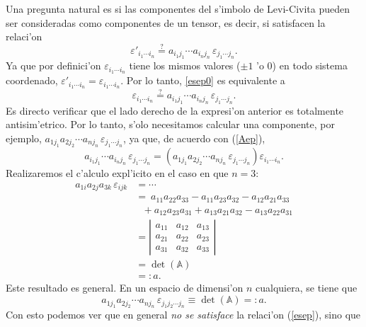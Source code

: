 Una pregunta natural es si las componentes del s'imbolo de Levi-Civita pueden ser consideradas como componentes de un tensor, es decir, si satisfacen la relaci'on
\begin{equation}\label{esep0}
\varepsilon'_{i_1\cdots i_n}\stackrel{?}{=}a_{i_1j_1}\cdots a_{i_nj_n}\,\varepsilon_{j_1\cdots j_n}.
\end{equation}
Ya que por definici'on $\varepsilon_{i_1\cdots i_n}$  tiene los mismos valores ($\pm 1$ 'o $0$) en todo sistema coordenado, $\varepsilon'_{i_1\cdots i_n}=\varepsilon_{i_1\cdots i_n}$. Por lo tanto, \eqref{esep0} es equivalente a
\begin{equation}\label{esep}
\varepsilon_{i_1\cdots i_n}\stackrel{?}{=}a_{i_1j_1}\cdots a_{i_nj_n}\,\varepsilon_{j_1\cdots j_n}.
\end{equation}
Es directo verificar que el lado derecho de la expresi'on anterior es totalmente antisim'etrico. Por lo tanto, s'olo necesitamos calcular una componente, por ejemplo, $a_{1j_1}a_{2j_2}\cdots a_{nj_n}\,\varepsilon_{j_1\cdots j_n}$, ya que, de acuerdo con (\ref{Aep}),
\begin{equation}
a_{i_1j_1}\cdots a_{i_nj_n}\,\varepsilon_{j_1\cdots j_n} =\left(a_{1j_1}a_{2j_2}\cdots a_{nj_n}\,\varepsilon_{j_1\cdots j_n}\right) \varepsilon_{i_1\cdots i_n}.
\end{equation}
Realizaremos el c'alculo expl'icito en el caso en que $n=3$:
\begin{align}
a_{1i}a_{2j}a_{3k}\,\varepsilon_{ijk} &= \cdots \\
&=\ a_{11}a_{22}a_{33}-a_{11}a_{23}a_{32}-a_{12}a_{21}a_{33} \\
&\ \ \ +a_{12}a_{23}a_{31}+a_{13}a_{21}a_{32}-a_{13}a_{22}a_{31} \\
&= \left|\begin{array}{ccc}
a_{11} & a_{12} & a_{13} \\ 
a_{21} & a_{22} & a_{23} \\ 
a_{31} & a_{32} & a_{33}
\end{array} \right| \\
&=  \det(\mathbb{A}) \\
&=: a.
\end{align}
Este resultado es general. En un espacio de dimensi'on $n$ cualquiera, se tiene que
\begin{equation}
a_{1j_1}a_{2j_2}\cdots a_{nj_n}\,\varepsilon_{j_1j_2\cdots j_n}\equiv \det(\mathbb{A})=:a .
\end{equation}
Con esto podemos ver que en general \textit{no se satisface} la relaci'on (\ref{esep}), sino que
